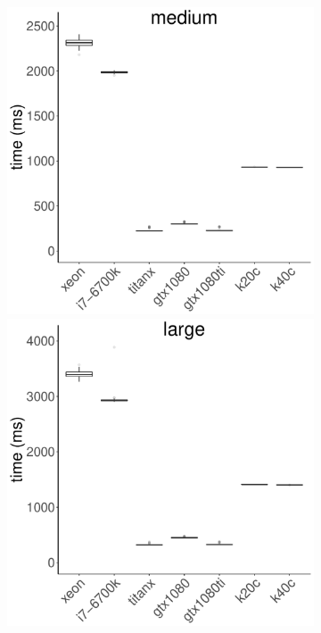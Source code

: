 \documentclass[../document.tex]{subfiles}
\begin{document}
\begin{figure}[t]
\begin{subfigure}{0.9\textwidth}
		\includegraphics[width=\plotwidth]{figures/time-results/generate_gem_medium_boxplot-1}
		\includegraphics[width=\plotwidth]{figures/time-results/generate_gem_large_boxplot-1}
		\end{subfigure}


\end{figure}
\end{document}

